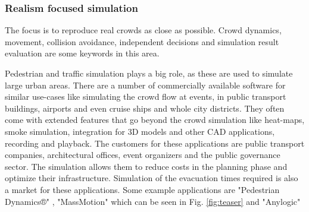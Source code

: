 \documentclass{acmsiggraph}               %
\begin{document}
\subsubsection{Realism focused simulation}
The focus is to reproduce real crowds as close as possible. Crowd dynamics, movement, collision avoidance, independent decisions and simulation result evaluation are some keywords in this area. 

Pedestrian and traffic simulation plays a big role, as these are used to simulate large urban areas. There are a number of commercially available software for similar use-cases like simulating the crowd flow at events, in public transport buildings, airports and even cruise ships and whole city districts. They often come with extended features that go beyond the crowd simulation like heat-maps, smoke simulation, integration for 3D models and other CAD applications, recording and playback. The customers for these applications are public transport companies, architectural offices, event organizers and the public governance sector. The simulation allows them to reduce costs in the planning phase and optimize their infrastructure. Simulation of the evacuation times required is also a market for these applications. Some example applications are "Pedestrian Dynamics®" \cite{pedestrian_dynamics_pedestrian_2020}, "MassMotion"  \cite{mediaworks_pedestrian_2020} which can be seen in Fig. \ref{fig:teaser} and "Anylogic" \cite{anylogic_website}


\end{document}
